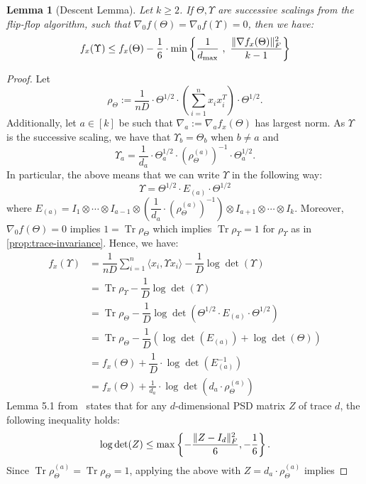 \documentclass[aos]{imsart}
\newtheorem{lemma}[theorem]{Lemma}
\theoremstyle{definition}
\numberwithin{equation}{section}
\DeclareMathOperator{\tr}{Tr}
\DeclarePairedDelimiter{\norm}{\lVert}{\rVert}
\def\dmax{d_{\max}}
\begin{document}
\begin{lemma}[Descent Lemma]\label{lem:tensor-descent-lemma}
	Let $k \geq 2$. If $\Theta, \Upsilon$ are successive scalings from the flip-flop algorithm, such that $\nabla_0 f(\Theta) = \nabla_0 f(\Upsilon) = 0$, then we have:
	$$ f_x(\Upsilon) \leq f_x(\Theta) - \dfrac{1}{6} \cdot \min\left\{ \dfrac{1}{\dmax} \ , \ \dfrac{\norm{\nabla f_x(\Theta)}_F^2}{k - 1} \right\} $$
\end{lemma}
\begin{proof}
	Let
	$$\rho_\Theta := \dfrac{1}{nD} \cdot  \Theta^{1/2} \cdot \left( \sum_{i=1}^n x_i x_i^T \right) \cdot \Theta^{1/2}.$$
	Additionally, let $a \in [k]$ be such that $\nabla_a := \nabla_a f_x(\Theta)$ has largest norm.
	As $\Upsilon$ is the successive scaling, we have that $\Upsilon_b = \Theta_b$ when $b \neq a$ and
	$$ \Upsilon_a = \dfrac{1}{d_a} \cdot \Theta_a^{1/2} \cdot (\rho_\Theta^{(a)})^{-1} \cdot \Theta_a^{1/2}. $$
	In particular, the above means that we can write $\Upsilon$ in the following way:
	$$ \Upsilon = \Theta^{1/2} \cdot  E_{(a)} \cdot \Theta^{1/2} $$
	where $E_{(a)} = I_1 \otimes \cdots \otimes I_{a-1} \otimes \left( \dfrac{1}{d_a} \cdot (\rho_\Theta^{(a)})^{-1} \right) \otimes I_{a+1} \otimes \cdots \otimes I_k$. Moreover, $\nabla_0 f(\Theta) = 0$ implies $1 = \tr \rho_\Theta$ which implies $\tr \rho_\Upsilon = 1$ for $\rho_\Upsilon$ as in \cref{prop:trace-invariance}.
	Hence, we have:
	\begin{align*}
		f_x(\Upsilon) &= \dfrac{1}{nD} \sum_{i=1}^n \langle x_i , \Upsilon x_i \rangle - \dfrac{1}{D} \log \det(\Upsilon) \\
		&=\tr \rho_\Upsilon- \dfrac{1}{D} \log \det(\Upsilon) \\
		&= \tr \rho_\Theta - \dfrac{1}{D} \log \det(\Theta^{1/2} \cdot  E_{(a)} \cdot \Theta^{1/2}) \\
		&= \tr \rho_\Theta - \dfrac{1}{D} \left( \log \det(E_{(a)}) + \log\det(\Theta) \right) \\
		&= f_x(\Theta) + \dfrac{1}{D} \cdot \log \det\left( E_{(a)}^{-1} \right) \\
		&= f_x(\Theta) + \frac{1}{d_a} \cdot  \log\det\left( d_a \cdot \rho_\Theta^{(a)} \right)
	\end{align*}
	Lemma 5.1 from~\cite{GGOW19} states that for any $d$-dimensional PSD matrix $Z$ of trace $d$, the following inequality holds:
	$$ \log\det(Z) \leq \max\left\{- \dfrac{\norm{Z - I_d}_F^2}{6}, - \dfrac{1}{6} \right\}. $$
	Since $\tr \rho_\Theta^{(a)} = \tr \rho_\Theta = 1$, applying the above with $Z = d_a \cdot \rho_\Theta^{(a)}$ implies

\end{proof}
\end{document}

